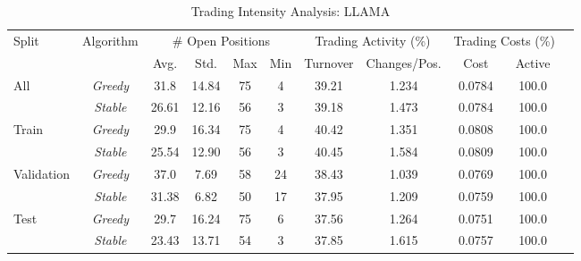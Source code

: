 
\begin{table}[htbp] 
\caption{Trading Intensity Analysis: LLAMA} 
\centering 
\label{tab:LLM_portfolio_statistics}
{\small
\begin{tabular}{lcccccccccc}
\toprule
Split & Algorithm & \multicolumn{4}{c}{\# Open Positions} & \multicolumn{2}{c}{Trading Activity (\%)} & \multicolumn{2}{c}{Trading Costs (\%)} \\
\cmidrule(lr{0.6em}){3-6} \cmidrule(lr{0.6em}){7-8} \cmidrule(lr{0.6em}){9-10}
& & Avg. & Std. & Max & Min & Turnover & Changes/Pos. & Cost & Active \\
\midrule
\multirow{2}{*}{All} & \textit{Greedy} & 31.8 & 14.84 & 75 & 4 & 39.21 & 1.234 & 0.0784 & 100.0 \\
 & \textit{Stable} & 26.61 & 12.16 & 56 & 3 & 39.18 & 1.473 & 0.0784 & 100.0 \\
\midrule
\multirow{2}{*}{Train} & \textit{Greedy} & 29.9 & 16.34 & 75 & 4 & 40.42 & 1.351 & 0.0808 & 100.0 \\
 & \textit{Stable} & 25.54 & 12.90 & 56 & 3 & 40.45 & 1.584 & 0.0809 & 100.0 \\
\midrule
\multirow{2}{*}{Validation} & \textit{Greedy} & 37.0 & 7.69 & 58 & 24 & 38.43 & 1.039 & 0.0769 & 100.0 \\
 & \textit{Stable} & 31.38 & 6.82 & 50 & 17 & 37.95 & 1.209 & 0.0759 & 100.0 \\
\midrule
\multirow{2}{*}{Test} & \textit{Greedy} & 29.7 & 16.24 & 75 & 6 & 37.56 & 1.264 & 0.0751 & 100.0 \\
 & \textit{Stable} & 23.43 & 13.71 & 54 & 3 & 37.85 & 1.615 & 0.0757 & 100.0 \\
\bottomrule
\end{tabular}
}


\end{table}
